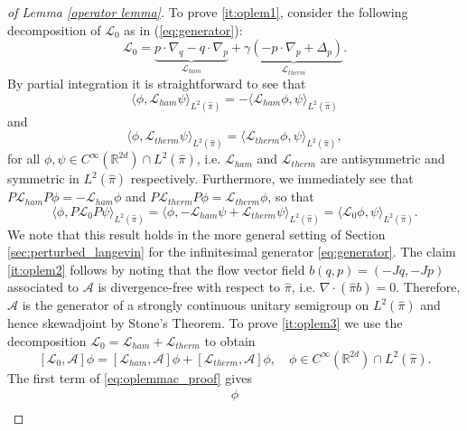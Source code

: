 \begin{proof}[of Lemma \ref{operator lemma}]
	To prove \ref{it:oplem1}, consider the following
	decomposition of $\mathcal{L}_{0}$ as in (\ref{eq:generator}):
	\[
	\mathcal{L}_{0}=\underbrace{p\cdot\nabla_{q}-q\cdot\nabla_{p}}_{\mathcal{L}_{ham}}+\underbrace{\gamma\left(- p\cdot\nabla_{p}+ \Delta_{p}\right)}_{\mathcal{L}_{therm}}.
	\]
	By partial integration it is straightforward to see that 
	\begin{equation*}
	\langle\phi,\mathcal{L}_{ham}\psi\rangle_{ L^{2}(\widehat{\pi})}=-\langle\mathcal{L}_{ham}\phi,\psi\rangle_{ L^{2}(\widehat{\pi})}
	\end{equation*}
	and
	\begin{equation*}
	 \langle \phi,\mathcal{L}_{therm}\psi\rangle_{ L^{2}(\widehat{\pi})}=\langle\mathcal{L}_{therm}\phi,\psi\rangle_{ L^{2}(\widehat{\pi})},
	 \end{equation*}
	 for all $\phi,\psi \in C^{\infty}(\mathbb{R}^{2d})\cap L^2(\widehat{\pi})$,
	  i.e. $\mathcal{L}_{ham}$ and $\mathcal{L}_{therm}$
	are antisymmetric and symmetric in $L^{2}(\widehat{\pi})$ respectively.
	Furthermore, we immediately see that $P\mathcal{L}_{ham}P\phi=-\mathcal{L}_{ham}\phi$ and $P\mathcal{L}_{therm}P\phi = \mathcal{L}_{therm}\phi$, so that
	\[
	\langle \phi,P\mathcal{L}_{0}P\psi\rangle_{ L^{2}(\widehat{\pi})}=\langle\phi,-\mathcal{L}_{ham}\psi+\mathcal{L}_{therm}\psi\rangle_{ L^{2}(\widehat{\pi})}=\langle\mathcal{L}_{0}\phi,\psi\rangle_{ L^{2}(\widehat{\pi})}.
	\]
	We note that this result holds in the more general setting of Section \ref{sec:perturbed_langevin} for the infinitesimal generator \eqref{eq:generator}.  The claim \ref{it:oplem2} follows by noting that the flow vector field $b(q,p)=(-Jq,-Jp)$ associated to $\mathcal{A}$ is divergence-free with respect to $\widehat{\pi}$, i.e. $\nabla \cdot(\widehat{\pi}b)=0$. Therefore, $\mathcal{A}$ is the generator of a strongly continuous unitary semigroup on $L^2(\widehat{\pi})$ and hence skewadjoint by Stone's Theorem.
  To prove \ref{it:oplem3} we use the decomposition $\mathcal{L}_{0}=\mathcal{L}_{ham}+\mathcal{L}_{therm}$ to obtain
	\begin{equation}
	\label{eq:oplemmac_proof}
	[\mathcal{L}_{0},\mathcal{A}]\phi=[\mathcal{L}_{ham},\mathcal{A}]\phi+[\mathcal{L}_{therm},\mathcal{A}]\phi,\quad \phi \in C^\infty(\mathbb{R}^{2d})\cap L^2(\widehat{\pi}).
	\end{equation}
	The first term of \eqref{eq:oplemmac_proof} gives 
	\begin{align*}
	[p\cdot\nabla_{q}-q\cdot\nabla_{p}&,-Jq\cdot\nabla_{q} -Jp\cdot\nabla_{p}]\phi\\

\end{align*}
\end{proof}
